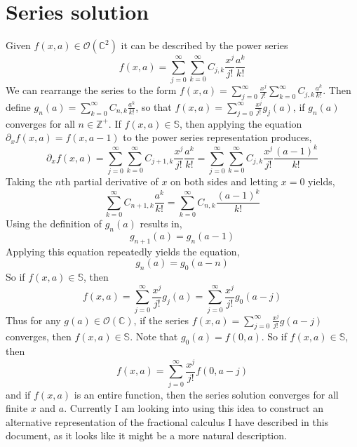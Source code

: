 \documentclass[%
 onecolumn,
 amsmath, amssymb, aps, pra, 10pt
]{revtex4-2}
\begin{document}
\section*{Series solution}
Given $f(x, a) \in \mathcal{O}(\mathbb{C}^2)$ it can be described by the power series
$$f(x, a) = \sum_{j=0}^{\infty} \sum_{k=0}^{\infty} C_{j, k} \frac{x^j}{j!} \frac{a^k}{k!}$$
We can rearrange the series to the form $f(x, a) = \sum_{j=0}^{\infty} \frac{x^j}{j!} \sum_{k=0}^{\infty} C_{j, k} \frac{a^k}{k!}$. Then define $g_n(a) = \sum_{k=0}^{\infty} C_{n, k} \frac{a^k}{k!}$, so that $f(x, a) = \sum_{j=0}^{\infty} \frac{x^j}{j!} g_j(a)$, if $g_n(a)$ converges for all $n \in \mathbb{Z}^+$. If $f(x, a) \in \mathbb{S}$, then applying the equation $\partial_x f(x, a) = f(x, a - 1)$ to the power series representation produces,
$$\partial_x f(x, a) = \sum_{j=0}^{\infty} \sum_{k=0}^{\infty} C_{j + 1, k} \frac{x^j}{j!} \frac{a^k}{k!} = \sum_{j=0}^{\infty} \sum_{k=0}^{\infty} C_{j, k} \frac{x^j}{j!} \frac{(a - 1)^k}{k!}$$
Taking the $n$th partial derivative of $x$ on both sides and letting $x=0$ yields,
$$\sum_{k=0}^{\infty} C_{n + 1, k} \frac{a^k}{k!} = \sum_{k=0}^{\infty} C_{n, k} \frac{(a -1)^k}{k!}$$
Using the definition of $g_n(a)$ results in,
$$g_{n+1}(a) = g_{n}(a - 1)$$
Applying this equation repeatedly yields the equation,
$$g_{n}(a) = g_{0}(a - n)$$
So if $f(x, a) \in \mathbb{S}$, then
$$f(x, a) = \sum_{j=0}^{\infty} \frac{x^j}{j!} g_{j}(a) = \sum_{j=0}^{\infty} \frac{x^j}{j!} g_{0}(a - j)$$
Thus for any $g(a) \in \mathcal{O}(\mathbb{C})$, if the series $f(x, a) = \sum_{j=0}^{\infty} \frac{x^j}{j!} g(a - j)$ converges, then $f(x, a) \in \mathbb{S}$. Note that $g_{0}(a) = f(0, a)$. So if $f(x, a) \in \mathbb{S}$, then 
\begin{equation}
f(x, a) = \sum_{j=0}^{\infty} \frac{x^j}{j!} f(0, a - j)
\label{series_solution}
\end{equation}
and if $f(x, a)$ is an entire function, then the series solution converges for all finite $x$ and $a$. Currently I am looking into using this idea to construct an alternative representation of the fractional calculus I have described in this document, as it looks like it might be a more natural description.



\end{document}

